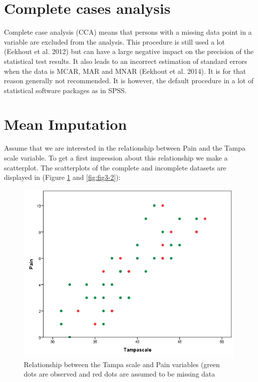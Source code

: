 \documentclass[]{book}
\theoremstyle{definition}
\theoremstyle{definition}
\theoremstyle{definition}
\theoremstyle{remark}
\begin{document}
\section{Complete cases analysis}\label{complete-cases-analysis}

Complete case analysis (CCA) means that persons with a missing data
point in a variable are excluded from the analysis. This procedure is
still used a lot (Eekhout et al. 2012) but can have a large negative
impact on the precision of the statistical test results. It also leads
to an incorrect estimation of standard errors when the data is MCAR, MAR
and MNAR (Eekhout et al. 2014). It is for that reason generally not
recommended. It is however, the default procedure in a lot of
statistical software packages as in SPSS.

\section{Mean Imputation}\label{mean-imputation}

Assume that we are interested in the relationship between Pain and the
Tampa scale variable. To get a first impression about this relationship
we make a scatterplot. The scatterplots of the complete and incomplete
datasets are displayed in (Figure \ref{fig:fig3-1} and
\ref{fig:fig3-2}):

\begin{figure}

{\centering \includegraphics[width=0.9\linewidth]{images/fig3.2a} 

}

\caption{ Relationship between the Tampa scale and Pain variables (green dots are observed and red dots are assumed to be missing data}\label{fig:fig3-1}
\end{figure}
\end{document}
